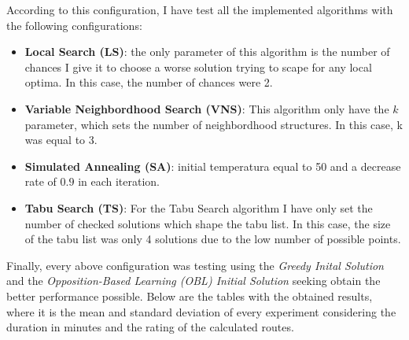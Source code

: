 \documentclass[preprint,14pt]{elsarticle}
\begin{document}
According to this configuration, I have test all the implemented algorithms with the following configurations:

\begin{itemize}
    \item \textbf{Local Search (LS)}: the only parameter of this algorithm is the number of chances I give it to choose a worse solution trying to scape for any local optima. In this case, the number of chances were 2.
    \item \textbf{Variable Neighbordhood Search (VNS)}: This algorithm only have the $k$ parameter, which sets the number of neighbordhood structures. In this case, k was equal to 3.
    \item \textbf{Simulated Annealing (SA)}: initial temperatura equal to 50 and a decrease rate of $0.9$ in each iteration.
    \item \textbf{Tabu Search (TS)}: For the Tabu Search algorithm I have only set the number of checked solutions which shape the tabu list. In this case, the size of the tabu list was only 4 solutions due to the low number of possible points.
\end{itemize}

Finally, every above configuration was testing using the \textit{Greedy Inital Solution} and the \textit{Opposition-Based Learning (OBL) Initial Solution} seeking obtain the better performance possible. Below are the tables with the obtained results, where it is the mean and standard deviation of every experiment considering the duration in minutes and the rating of the calculated routes.
\end{document}

